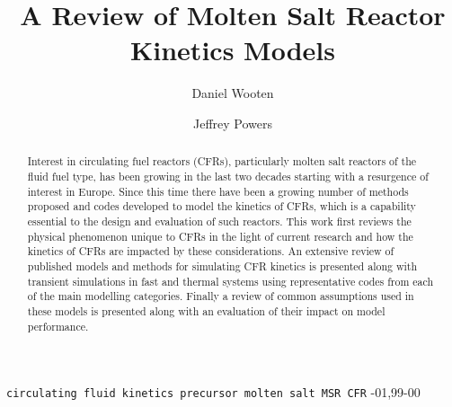 \documentclass[review]{elsarticle}
\begin{document}
\begin{frontmatter}

\title{A Review of Molten Salt Reactor Kinetics Models}

\author[ucb]{Daniel Wooten}
\address[ucb]{4155 Etcheverry Hall, MC 1730, University of California, Berkeley,
    Berkeley, CA 94720-1730, United States}

\author[ornl]{Jeffrey Powers}
\address[ornl]{Oak Ridge National Laboratory, Oak Ridge, TN 37831, United States }

\begin{abstract}
Interest in circulating fuel reactors (CFRs), particularly molten salt reactors
 of the fluid fuel type, has been growing in the last two decades starting with a
resurgence of interest in Europe. Since this time there have been a growing
number of methods proposed and codes developed to model the kinetics of CFRs, which is
a capability essential to the design and evaluation of such reactors. This work
first reviews the physical phenomenon unique to CFRs in the light of current
research and how the kinetics of CFRs are impacted by these considerations.
 An extensive review of published models and methods for simulating CFR kinetics
is presented along with transient simulations in fast and thermal systems using
representative codes from each of the main modelling categories. Finally a
review of common assumptions used in these models is presented along with an
evaluation of their impact on model performance. 
\end{abstract}

\begin{keyword}
\texttt{circulating fluid kinetics precursor molten salt MSR CFR}
-01\sep  99-00
\end{keyword}

\end{frontmatter}

\linenumbers
\end{document}
